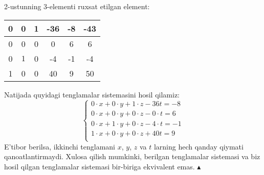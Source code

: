 \begin{enumerate}
2-ustunning 3-elementi ruxsat etilgan element:
\begin{center}
	\begin{tabular}{|c|c|c|c|c|c|}
		\hline
		0&0&1&-36&-8&-43\\ \hline
		0&0&0&0&6&6\\ \hline
		0&$\boxed{1}$&0&-4&-1&-4\\ \hline
		1&0&0&40&9&50\\ \hline
	\end{tabular}
\end{center}
Natijada quyidagi tenglamalar sistemasini hosil qilamiz:
$$\begin{cases}
0\cdot x+0\cdot y+1\cdot z-36t=-8\\ 
0\cdot x+0\cdot y+0\cdot z-0\cdot t=6\\ 
0\cdot x+1\cdot y+0\cdot z-4\cdot t=-1\\
1\cdot x+0\cdot y+0\cdot z+40t=9\\
\end{cases}
$$
E'tibor berilsa, ikkinchi tenglamani $x$, $y$, $z$ va $t$ larning hech qanday qiymati qanoatlantirmaydi. Xulosa qilish mumkinki, berilgan tenglamalar sistemasi va biz hosil qilgan tenglamalar sistemasi bir-biriga ekvivalent emas. $\blacktriangle$


\end{enumerate}
